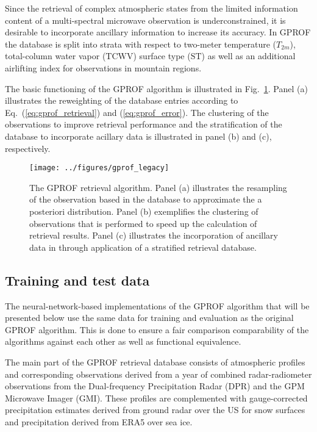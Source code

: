 \documentclass[a4paper,11pt,bibtotoc]{scrartcl}
\begin{document}
Since the retrieval of complex atmospheric states from the limited information
content of a multi-spectral microwave observation is underconstrained, it is
desirable to incorporate ancillary information to increase its accuracy. In
GPROF the database is split into strata with respect to two-meter temperature
($T_{2m}$), total-column water vapor ($\text{TCWV}$) surface type ($\text{ST}$)
as well as an additional airlifting index for observations in mountain regions.

The basic functioning of the GPROF algorithm is illustrated in
Fig.~\ref{fig:gprof_legacy}. Panel (a) illustrates the reweighting of the
database entries according to Eq.~(\ref{eq:gprof_retrieval}) and
(\ref{eq:gprof_error}). The clustering of the observations to improve retrieval
performance and the stratification of the database to incorporate acillary data
is illustrated in panel (b) and (c), respectively.

\begin{figure}[hbpt]
  \centering
    \texttt{[image: ../figures/gprof\_legacy]}
    \caption{The GPROF retrieval algorithm. Panel (a) illustrates the
      resampling of the observation based in the database to approximate the a
      posteriori distribution. Panel (b) exemplifies the clustering of
      observations that is performed to speed up the calculation of retrieval
      results. Panel (c) illustrates the incorporation of ancillary data in
      through application of a stratified retrieval database.}
  \label{fig:gprof_legacy}
\end{figure}

\subsection{Training and test data}

The neural-network-based implementations of the GPROF algorithm that will be
presented below use the same data for training and evaluation as the original
GPROF algorithm. This is done to ensure a fair comparison comparability of the
algorithms against each other as well as functional equivalence.

The main part of the GPROF retrieval database consists of atmospheric profiles
and corresponding observations derived from a year of combined radar-radiometer
observations from the Dual-frequency Precipitation Radar (DPR) and the GPM
Microwave Imager (GMI). These profiles are complemented with gauge-corrected
precipitation estimates derived from ground radar over the US for snow surfaces
and precipitation derived from ERA5 over sea ice.
\end{document}
